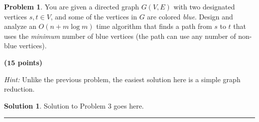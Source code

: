 \documentclass{article}
\theoremstyle{definition}
\newtheorem{problem}{Problem}
\def\fline{\rule{0.75\linewidth}{0.5pt}}
\newcommand{\finishline}{\vspace{-15pt}\begin{center}\fline\end{center}}
\newtheorem*{solution*}{Solution}
\newenvironment{solution}{\begin{solution*}}{{\finishline} \end{solution*}}
\newcommand{\grade}[1]{\hfill{\textbf{($\mathbf{#1}$ points)}}}
\begin{document}
\begin{problem}

You are given a directed graph $G(V,E)$ with two designated vertices $s,t \in V$, and some of the vertices in $G$ are colored \emph{blue}. 
Design and analyze an $O(n+m\log{m})$ time algorithm that finds a path from $s$ to $t$ that uses the \emph{minimum} number of blue vertices (the path can use any  number of non-blue vertices).  

\grade{15}

\emph{Hint:} Unlike the previous problem, the easiest solution here is a simple graph reduction. 
\end{problem}

\begin{solution}
	Solution to Problem 3 goes here.  
\end{solution}
\end{document}
